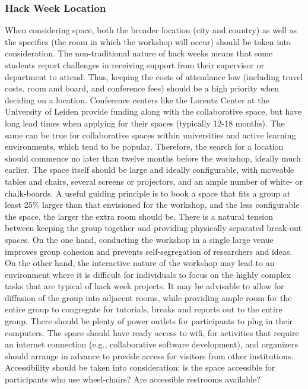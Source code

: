 \documentclass{aastex62}
\begin{document}
\subsubsection{Hack Week Location}
When considering space, both the broader location (city and country) as well as the specifics (the room in which the workshop will occur) should be taken into consideration. The non-traditional nature of hack weeks means that some students report challenges in receiving support from their supervisor or department to attend. Thus, keeping the costs of attendance low (including travel costs, room and board, and conference fees) should be a high priority when deciding on a location. Conference centers like the Lorentz Center at the University of Leiden provide funding along with the collaborative space, but have long lead times when applying for their spaces (typically 12-18 months). The same can be true for collaborative spaces within universities and active learning environments, which tend to be popular. Therefore, the search for a location should commence no later than twelve months before the workshop, ideally much earlier.
The space itself should be large and ideally configurable, with moveable tables and chairs, several screens or projectors, and an ample number of white- or chalk-boards. A useful guiding principle is to book a space that fits a group at least 25\% larger than that envisioned for the workshop, and the less configurable the space, the larger the extra room should be.
There is a natural tension between keeping the group together and providing physically separated break-out spaces. On the one hand, conducting the workshop in a single large venue improves group cohesion and prevents self-segregation of researchers and ideas. On the other hand, the interactive nature of the workshop may lead to an environment where it is difficult for individuals to focus on the highly complex tasks that are typical of hack week projects. It may be advisable to allow for diffusion of the group into adjacent rooms, while providing ample room for the entire group to congregate for tutorials, breaks and reports out to the entire group.
There should be plenty of power outlets for participants to plug in their computers.
The space should have ready access to wifi, for activities that require an internet connection (e.g., collaborative software development), and organizers should arrange in advance to provide access for visitors from other institutions.
Accessibility should be taken into consideration: is the space accessible for participants who use wheel-chairs? Are accessible restrooms available?
\end{document}
